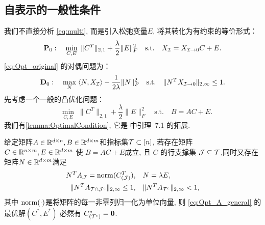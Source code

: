 \subsection{自表示的一般性条件}
我们不直接分析 \eqref{eq:multi},    而是引入松弛变量\(E\), 将其转化为有约束的等价形式：
\begin{equation}\label{eq:Opt_original}
  \mathbf{P}_0:\quad \min_{C, E} \;
  \|C^T\|_{2,1}+\frac{\lambda}{2}\|E\|_F^2 \quad
  \text{s.t.} \quad X_{\mathcal{I}}=X_{\mathcal{I}\rightarrow 0}C+E.
\end{equation}
 \eqref{eq:Opt_original} 的对偶问题为：
\begin{equation}\label{eq:Opt_original_dual}
  \mathbf{D}_0:\quad \max_{N} \; \langle N, X_{\mathcal{I}}\rangle -
  \frac{1}{2\lambda}\|N\|_F^2 \quad
  \text{s.t.} \quad \|N^T X_{\mathcal{I}\rightarrow 0}\|_{2,\infty} \leq 1.
\end{equation}
先考虑一个一般的凸优化问题：
\begin{equation}\label{eq:Opt_A_general}
  \quad \min_{C, E} \; \|C^T\|_{2,1}+\frac{\lambda}{2}\|E\|^2_F \quad
  \text{s.t.} \quad B=AC+E.
\end{equation}
我们有\autoref{lemma:OptimalCondition},  它是
\cite{soltanolkotabi2012geometric}中引理~7.1 的拓展.
\begin{lemma}\label{lemma:OptimalCondition}
  给定矩阵\(A\in \mathbb{R}^{d\times n}, B \in \mathbb{R}^{d\times m}\)和指标集\(\mathcal{T}\subset [n]\),
  若存在矩阵 \(C\in \mathbb{R}^{n\times m},E\in \mathbb{R}^{d\times m}\) 使 \(B=AC+E\)成立, 且
  \(C\) 的行支撑集 \(\mathcal{J}\subseteq
  \mathcal{T}\),同时又存在矩阵\(N\in\mathbb{R}^{d\times m}\)满足
  \begin{align*}
    N^T A_{\mathcal{J}} = \operatorname{norm}(C_{(\mathcal{J})}^T),  & \quad N=\lambda E, \\
    \|N^T A_{\mathcal{T}\cap \mathcal{J}^{c}}\|_{2, \infty} \leq 1, & \quad \|N^T A_{\mathcal{T}^{c}}\|_{2, \infty}<1,
  \end{align*}
  其中 \(\operatorname{norm}(\cdot)\)是将矩阵的每一非零列归一化为单位向量,
  则 \eqref{eq:Opt_A_general} 的最优解\((C^{*},E^{*})\) 必然有
  \(C^*_{(\mathcal{T}^c)}=\mathbf{0}\).
\end{lemma}
